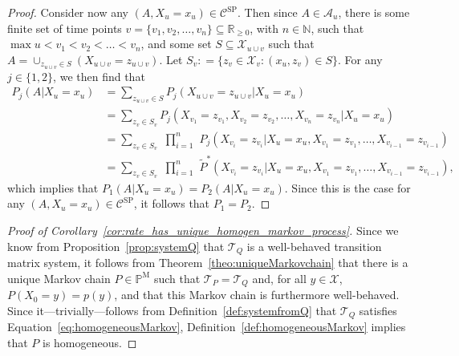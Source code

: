 \documentclass[10pt,a4paper]{paper}
\theoremstyle{definition}
\newcommand{\nats}{\mathbb{N}}
\newcommand{\reals}{\mathbb{R}}
\newcommand{\states}{\mathcal{X}}
\newcommand{\processes}{\mathbb{P}}
\newcommand{\mprocesses}{\processes^{\mathrm{M}}}
\newcommand{\coloneqq}{:\!=}
\begin{document}
\begin{proof}
Consider now any $(A,X_u=x_u)\in\mathcal{C}^\mathrm{SP}$. Then since $A\in\mathcal{A}_u$, there is some finite set of time points $v=\{v_1,v_2,\dots,v_n\}\subseteq\reals_{\geq0}$, with $n\in\nats$, such that $\max u<v_1<v_2<\dots<v_n$, and some set $S\subseteq\states_{u\cup v}$ such that $A=\cup_{z_{u\cup v}\in S}(X_{u\cup v}=z_{u\cup v})$. 
Let $S_v\coloneqq\{z_v\in\states_v\colon (x_u,z_v)\in S\}$.
For any $j\in\{1,2\}$, we then find that
\begin{align*}
P_j(A\vert X_u=x_u)
&=\sum_{z_{u\cup v}\in S}
P_j(X_{u\cup v}=z_{u\cup v}\vert X_u=x_u)\\
&=\sum_{z_{v}\in S_v}
P_j(X_{v_1}=z_{v_1}, X_{v_2}=z_{v_2}, \dots, X_{v_n}=z_{v_n}\vert X_u=x_u)\\[-1mm]
&=\sum_{z_{v}\in S_v}
\,\,
\prod_{i=1}^n
\,\,
P_j(X_{v_i}=z_{v_i}\vert X_u=x_u, X_{v_1}=z_{v_1}, \dots, X_{v_{i-1}}=z_{v_{i-1}})\\
&=\sum_{z_{v}\in S_v}
\,\,
\prod_{i=1}^n
\,\,
\tilde{P}^*(X_{v_i}=z_{v_i}\vert X_u=x_u, X_{v_1}=z_{v_1}, \dots, X_{v_{i-1}}=z_{v_{i-1}}),
\end{align*}
which implies that $P_1(A\vert X_u=x_u)=P_2(A\vert X_u=x_u)$. Since this is the case for any $(A,X_u=x_u)\in\mathcal{C}^\mathrm{SP}$, it follows that $P_1=P_2$.
\end{proof}

\begin{proof}[Proof of Corollary~\ref{cor:rate_has_unique_homogen_markov_process}]
Since we know from Proposition~\ref{prop:systemQ} that $\mathcal{T}_Q$ is a well-behaved transition matrix system, it follows from Theorem~\ref{theo:uniqueMarkovchain} that there is a unique Markov chain $P\in\mprocesses$ such that $\mathcal{T}_P=\mathcal{T}_Q$ and, for all $y\in\mathcal{X}$, $P(X_0=y)=p(y)$, and that this Markov chain is furthermore well-behaved. Since it---trivially---follows from Definition~\ref{def:systemfromQ} that $\mathcal{T}_Q$ satisfies Equation~\eqref{eq:homogeneousMarkov}, Definition~\ref{def:homogeneousMarkov} implies that $P$ is homogeneous.
\end{proof}
\end{document}
